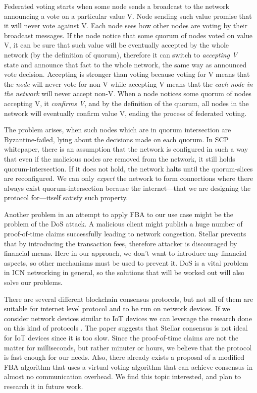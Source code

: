 \documentclass[nostrict]{szablonPG}
\begin{document}
Federated voting starts when some node sends a broadcast to the network announcing a vote on a particular value V. Node sending such value promise that it will never vote against V. Each node sees how other nodes are voting by their broadcast messages. If the node notice that some quorum of nodes voted on value V, it can be sure that such value will be eventually accepted by the whole network (by the definition of quorum), therefore it can switch to \textit{accepting V} state and announce that fact to the whole network, the same way as announced vote decision. Accepting is stronger than voting because voting for V means that the \textit{node} will never vote for non-V while accepting V means that the \textit{each node in the network} will never accept non-V. When a node notices some quorum of nodes accepting V, it \textit{confirms V}, and by the definition of the quorum, all nodes in the network will eventually confirm value V, ending the process of federated voting.

The problem arises, when such nodes which are in quorum intersection are Byzantine-failed, lying about the decisions made on each quorum. In SCP whitepaper, there is an assumption that the network is configured in such a way that even if the malicious nodes are removed from the network, it still holds quorum-intersection. If it does not hold, the network halts until the quorum-slices are reconfigured.
We can only \textit{expect} the network to form connections where there always exist quorum-intersection because the internet––that we are designing the protocol for––itself satisfy such property.

Another problem in an attempt to apply FBA to our use case might be the problem of the DoS attack. A malicious client might publish a huge number of proof-of-time claims successfully leading to network congestion. Stellar prevents that by introducing the transaction fees, therefore attacker is discouraged by financial means. Here in our approach, we don't want to introduce any financial aspects, so other mechanisms must be used to prevent it. DoS is a vital problem in ICN networking in general\cite{gasti2013and}, so the solutions that will be worked out will also solve our problems. 

There are several different blockchain consensus protocols, but not all of them are suitable for internet level protocol and to be run on network devices.
If we consider network devices similar to IoT devices we can leverage the research done on this kind of protocols \cite{salimitari2018survey}. The paper suggests that Stellar consensus is not ideal for IoT devices since it is too slow.
Since the proof-of-time claims are not the matter for milliseconds, but rather minuter or hours, we believe that the protocol is fast enough for our needs.
Also, there already exists a proposal of a modified FBA algorithm\cite{FCPpdf50:online} that uses a virtual voting algorithm that can achieve consensus in almost no communication overhead. We find this topic interested, and plan to research it in future work.
\end{document}
